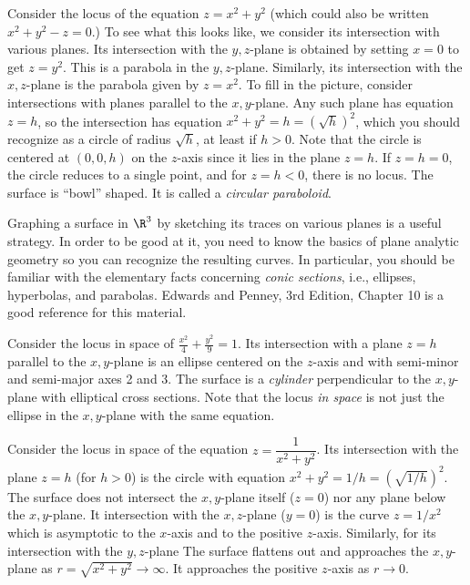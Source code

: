 \nextex
{}
Consider the locus of the equation $z = x^2 + y^2$ (which could
also be written $x^2 + y^2 - z = 0$.)  To see what this looks like,
we consider its intersection with various planes.   Its intersection
with the $y,z$-plane is obtained by setting $x = 0$ to get
$z = y^2$.  This is a parabola in the $y,z$-plane.  
Similarly, its intersection with the $x,z$-plane is the parabola
given by $z = x^2$.   To fill in the picture,  consider
intersections with planes parallel to the $x,y$-plane.  Any
such plane has equation $z = h$, so the intersection has equation
$x^2 + y^2 = h = (\sqrt h)^2$, which you should recognize as a circle
of radius $\sqrt h$, at least if $h > 0$.  Note that the circle is
centered at $(0,0,h)$ on the $z$-axis since it lies in the plane $z = h$.
If $z = h = 0$, the circle reduces to a single point, and for 
$z = h < 0$, there is no locus.
The surface is ``bowl'' shaped.  It is called a {\it circular
paraboloid}.
\endexample

Graphing a surface in $\R^3$ by sketching its traces on various
planes is a useful strategy.  In order to be good at it, you need
to know the basics of plane analytic geometry so you can recognize
the resulting curves.  In particular, you should be familiar with
the elementary facts concerning {\it conic sections\/}, i.e.,
ellipses, hyperbolas, and parabolas.   Edwards and Penney, 3rd Edition,
Chapter 10 is a good reference for this material.

\nextex
{}
Consider the locus in space of $\displaystyle{\frac{x^2}4 +
\frac{y^2} 9} = 1$.   Its intersection with a plane $z = h$
parallel to the $x,y$-plane is an ellipse centered on the $z$-axis
and with semi-minor and semi-major axes  2 and 3.   The surface
is a {\it cylinder\/} perpendicular to the $x,y$-plane with
elliptical cross sections.
Note that the locus {\it in space\/} is not just the ellipse
in the $x,y$-plane with the same equation.
\endexample
\medskip
\centerline{}
\medskip
\nextex
{}
Consider the locus in space of the equation
$z = \dfrac 1{x^2 + y^2}$.   Its intersection with the plane $z = h$
(for $h > 0$) is the circle with equation
$ x^2 + y^2 = 1/h = (\sqrt{1/h})^2$.   The surface does not intersect
the $x,y$-plane itself ($z = 0$) nor any plane below the $x,y$-plane.
It intersection with the $x,z$-plane ($y = 0$) is the curve
$z = 1/x^2$ which is asymptotic to the $x$-axis
and to the positive $z$-axis.  Similarly, for its intersection
with the $y,z$-plane   The surface flattens out and approaches the
$x,y$-plane as $r = \sqrt{x^2 + y^2} \to \infty$.  It approaches the
positive $z$-axis as $r \to 0$.
\endexample

